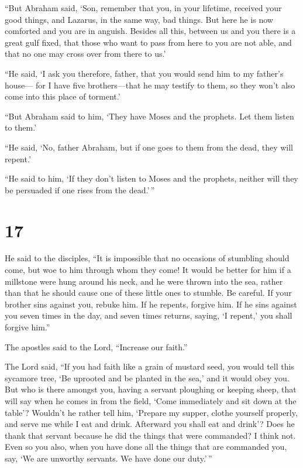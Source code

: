 ``But Abraham said, `Son, remember that you, in your
lifetime, received your good things, and Lazarus, in the same way, bad
things. But here he is now comforted and you are in anguish.
 Besides all this, between us and you there is a great gulf
fixed, that those who want to pass from here to you are not able, and
that no one may cross over from there to us.'

 ``He said, `I ask you therefore, father, that you would
send him to my father's house---  for I have five
brothers---that he may testify to them, so they won't also come into
this place of torment.'

 ``But Abraham said to him, `They have Moses and the
prophets. Let them listen to them.'

 ``He said, `No, father Abraham, but if one goes to them
from the dead, they will repent.'

 ``He said to him, `If they don't listen to Moses and the
prophets, neither will they be persuaded if one rises from the
dead.'\,''

\hypertarget{section-16}{%
\section{17}\label{section-16}}

 He said to the disciples, ``It is impossible that no
occasions of stumbling should come, but woe to him through whom they
come!  It would be better for him if a millstone were hung
around his neck, and he were thrown into the sea, rather than that he
should cause one of these little ones to stumble.  Be
careful. If your brother sins against you, rebuke him. If he repents,
forgive him.  If he sins against you seven times in the day,
and seven times returns, saying, `I repent,' you shall forgive him.''

 The apostles said to the Lord, ``Increase our faith.''

 The Lord said, ``If you had faith like a grain of mustard
seed, you would tell this sycamore tree, `Be uprooted and be planted in
the sea,' and it would obey you.  But who is there amongst
you, having a servant ploughing or keeping sheep, that will say when he
comes in from the field, `Come immediately and sit down at the table'?
 Wouldn't he rather tell him, `Prepare my supper, clothe
yourself properly, and serve me while I eat and drink. Afterward you
shall eat and drink'?  Does he thank that servant because he
did the things that were commanded? I think not.  Even so
you also, when you have done all the things that are commanded you, say,
`We are unworthy servants. We have done our duty.'\,''

